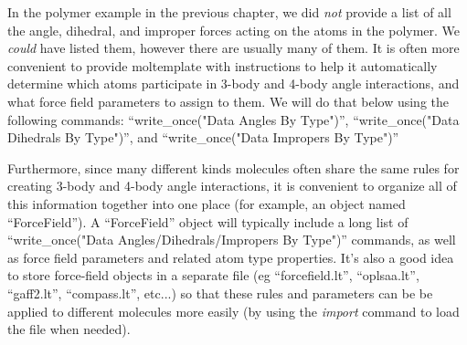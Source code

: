 \documentclass[11pt]{article}
\begin{document}
In the polymer example in the previous chapter,
we did \textit{not} provide a list of all the
angle, dihedral, and improper forces acting on the atoms in the polymer.
We \textit{could} have listed them, however there are usually many of them.
It is often more convenient to provide
moltemplate with instructions to help it automatically determine
which atoms participate in 3-body and 4-body angle interactions,
and what force field parameters to assign to them.
We will do that below using the following commands:
``write\_once("Data Angles By Type")'',
``write\_once("Data Dihedrals By Type")'', and
``write\_once("Data Impropers By Type")''


Furthermore, since many different kinds molecules often share
the same rules for creating 3-body and 4-body angle interactions,
it is convenient to organize all of this information
together into one place (for example, an object named ``ForceField'').
A ``ForceField'' object will typically include a long list of
``write\_once("Data Angles/Dihedrals/Impropers By Type")''
commands,
as well as force field parameters and related atom type properties.
It's also a good idea to store force-field objects in a separate file
(eg ``forcefield.lt'', ``oplsaa.lt'', ``gaff2.lt'', ``compass.lt'', etc...)
so that these rules and parameters can be be applied to different molecules
more easily (by using the \textit{import} command to load the file when needed).
\end{document}
